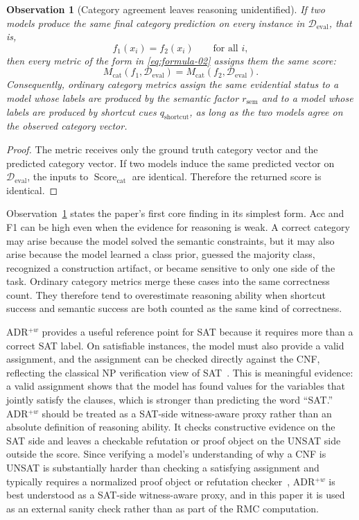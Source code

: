 \documentclass[conference]{IEEEtran}
\newtheorem{observation}{Observation}
\theoremstyle{remark}
\newcommand{\reasonFac}{r_{\mathrm{sem}}}
\newcommand{\shortcutFac}{q_{\mathrm{shortcut}}}
\newcommand{\EvalSet}{\mathcal{D}_{\mathrm{eval}}}
\newcommand{\CatMetric}{M_{\mathrm{cat}}}
\newcommand{\CatScore}{\operatorname{Score}_{\mathrm{cat}}}
\begin{document}
\begin{observation}[Category agreement leaves reasoning unidentified]
\label{obs:nonid}
If two models produce the same final category prediction on every instance in
$\EvalSet$, that is,
\begin{equation}\label{eq:formula-03}
f_1(x_i)=f_2(x_i)\qquad\text{for all }i,
\end{equation}
then every metric of the form in \cref{eq:formula-02} assigns them the same
score:
\begin{equation}\label{eq:formula-04}
\CatMetric(f_1,\EvalSet)=\CatMetric(f_2,\EvalSet).
\end{equation}
Consequently, ordinary category metrics assign the same evidential status to a model whose labels are produced by the semantic factor $\reasonFac$ and to a model whose labels are produced by shortcut cues $\shortcutFac$, as long as the two models agree on the observed category vector.
\end{observation}

\begin{proof}
The metric receives only the ground truth category vector and the predicted
category vector.  If two models induce the same predicted vector on
$\EvalSet$, the inputs to $\CatScore$ are identical.  Therefore the returned score
is identical.
\end{proof}

Observation~\ref{obs:nonid} states the paper's first core finding in its simplest form.  Acc and F1 can be high even when the evidence for reasoning is weak.  A correct category may arise because the model solved the semantic constraints, but it may also arise because the model learned a class prior, guessed the majority class, recognized a construction artifact, or became sensitive to only one side of the task.  Ordinary category metrics merge these cases into the same correctness count.  They therefore tend to overestimate reasoning ability when shortcut success and semantic success are both counted as the same kind of correctness.

ADR$^{+w}$ provides a useful reference point for SAT because it requires more than a correct SAT label.  On satisfiable instances, the model must also provide a valid assignment, and the assignment can be checked directly against the CNF, reflecting the classical NP verification view of SAT~\cite{cook2023complexity}.  This is meaningful evidence: a valid assignment shows that the model has found values for the variables that jointly satisfy the clauses, which is stronger than predicting the word ``SAT.''  ADR$^{+w}$ should be treated as a SAT-side witness-aware proxy rather than an absolute definition of reasoning ability.  It checks constructive evidence on the SAT side and leaves a checkable refutation or proof object on the UNSAT side outside the score.  Since verifying a model's understanding of why a CNF is UNSAT is substantially harder than checking a satisfying assignment and typically requires a normalized proof object or refutation checker~\cite{heule2016drat,cruz2017lrat}, ADR$^{+w}$ is best understood as a SAT-side witness-aware proxy, and in this paper it is used as an external sanity check rather than as part of the RMC computation.
\end{document}
